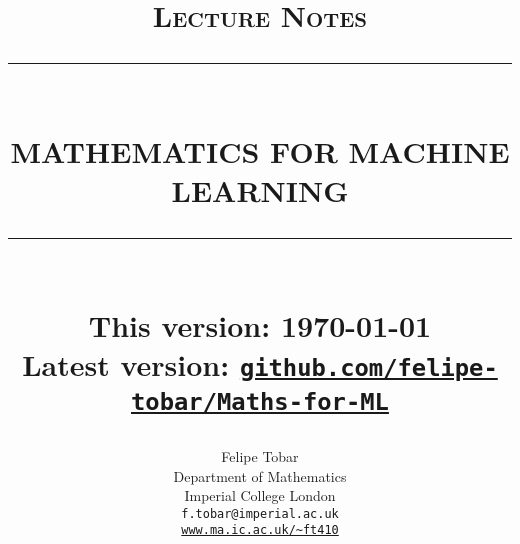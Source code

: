 
\newcommand{\HRule}[1]{\rule{\linewidth}{#1}} 	%

\makeatletter							%
\def\printtitle{%
    {\centering \@title\par}}
\makeatother									

\makeatletter							%
\def\printauthor{%
    {\centering \large \@author}}				
\makeatother							

\title{	\normalsize \textsc{Lecture Notes} 	%
		 	\\[6.0cm]								%
			\HRule{0.5pt} \\ [0.2cm]						%
			 \textbf{\uppercase{\LARGE Mathematics for Machine Learning}}	%
			\HRule{2pt} \\ [0.2cm]		%
			\large This version: \today\\	[0.2cm]		%
			\large Latest version: \href{https://github.com/felipe-tobar/Maths-for-ML}{\tt github.com/felipe-tobar/Maths-for-ML}
		}

\author{
		Felipe Tobar\\	
		Department of Mathematics\\	
		Imperial College London\\[1.0cm]
        \texttt{f.tobar@imperial.ac.uk} \\
        \href{https://www.ma.ic.ac.uk/~ft410/}{\tt www.ma.ic.ac.uk/\~{}ft410} \\[1.0cm]
}

